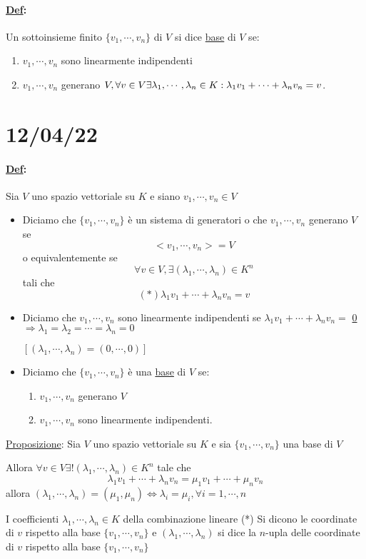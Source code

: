 \documentclass{article}
\newcommand{\ul}[1]{\underline{#1}}
\newcommand{\Def}[2]{\paragraph{\ul{Def}:}#1\\\hspace*{3em}\begin{minipage}{.8\textwidth}#2\end{minipage}}
\begin{document}
	\Def{Un sottoinsieme finito $\{v_1,\cdots,v_n\}$ di $V$ si dice \ul{base} di $V$ se:}{
		\begin{enumerate}
			\item $v_1,\cdots,v_n$ sono linearmente indipendenti
			\item $v_1,\cdots,v_n$ generano $V,\forall v\in V\\\exists\lambda_1,\cdots,\lambda_n\in K:\lambda_1v_1+\cdots+\lambda_nv_n=v$.
		\end{enumerate}
	}
	\section{12/04/22}

	\Def{Sia $V$ uno spazio vettoriale su $K$ e siano $v_1,\cdots,v_n\in V$}{
		\begin{itemize}
			\item Diciamo che $\{v_1,\cdots,v_n\}$ è un sistema di generatori o che $v_1,\cdots,v_n$ generano $V$ se
			      $$<v_1,\cdots,v_n>=V$$
			      o equivalentemente se
			      $$\forall v\in V,\exists(\lambda_1,\cdots,\lambda_n)\in K^n$$
			      tali che
			      $$(*)\lambda_1v_1+\cdots+\lambda_nv_n=v$$
			\item Diciamo che $v_1,\cdots,v_n$ sono linearmente indipendenti se $\lambda_1v_1+\cdots+\lambda_nv_n=$ \ul{0} $\Rightarrow\lambda_1=\lambda_2=\cdots=\lambda_n=0$

			      $[(\lambda_1,\cdots,\lambda_n)=(0,\cdots,0)]$

			\item Diciamo che $\{v_1,\cdots,v_n\}$ è una \ul{base} di $V$ se:
			      \begin{enumerate}
				      \item $v_1,\cdots,v_n$ generano $V$
				      \item $v_1,\cdots,v_n$ sono linearmente indipendenti.
			      \end{enumerate}
		\end{itemize}
	}
	\ul{Proposizione}: Sia $V$ uno spazio vettoriale su $K$ e sia $\{v_1,\cdots,v_n\}$ una base di $V$

	Allora $\forall v\in V\exists!(\lambda_1,\cdots,\lambda_n)\in K^n$ tale che
	$$\lambda_1v_1+\cdots+\lambda_nv_n=\mu_1v_1+\cdots+\mu_nv_n$$
	allora $(\lambda_1,\cdots,\lambda_n)=(\mu_1,\mu_n)\Leftrightarrow\lambda_i=\mu_i,\forall i=1,\cdots,n$

	I coefficienti $\lambda_1,\cdots,\lambda_n\in K$ della combinazione lineare (*) Si dicono le coordinate di $v$ rispetto alla base $\{v_1,\cdots,v_n\}$ e $(\lambda_1,\cdots,\lambda_n)$ si dice la $n$-upla delle coordinate di $v$ rispetto alla base $\{v_1,\cdots,v_n\}$
\end{document}
